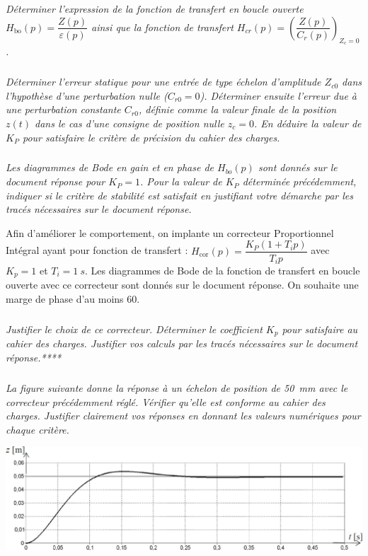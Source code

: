 \documentclass[10pt,fleqn]{article} %
\begin{document}
\subparagraph{}\textit{Déterminer l’expression de la fonction de transfert en boucle ouverte $H_{\text{bo}}(p)=\dfrac{Z(p)}{\varepsilon(p)}$ ainsi que la fonction de transfert  $H_{cr}(p)=
\left(\dfrac{Z(p)}{C_r(p)}\right)_{Z_c=0}$.}


\subparagraph{}\textit{Déterminer l’erreur statique pour une entrée de type échelon d’amplitude $Z_{c0}$ dans l’hypothèse d’une perturbation nulle ($C_{r0}=0$). Déterminer ensuite l’erreur due à une
perturbation constante $C_{r0}$, définie comme la valeur finale de la position $z(t)$ dans le cas d’une
consigne de position nulle $z_c= 0$. En déduire la valeur de $K_P$ pour satisfaire le critère de
précision du cahier des charges.}

\subparagraph{}\textit{Les diagrammes de Bode en gain et en phase de $H_{bo}(p)$ sont donnés sur le document réponse pour $K_P=1$. Pour la valeur de $K_P$ déterminée précédemment, indiquer si le critère de stabilité est satisfait en justifiant votre démarche par les tracés nécessaires sur le document
réponse.}

Afin d’améliorer le comportement, on implante un correcteur Proportionnel Intégral ayant pour
fonction de transfert : $H_{\text{cor}}(p)=\dfrac{K_P\left(1+T_i p\right)}{T_i p}$ avec $K_p=1$ et $T_i=\SI{1}{s}$.
Les diagrammes de Bode de la fonction de transfert en boucle ouverte avec ce correcteur sont
donnés sur le document réponse.
On souhaite une marge de phase d’au moins 60\degres.


\subparagraph{}\textit{Justifier le choix de ce correcteur. Déterminer le coefficient $K_p$ pour satisfaire au cahier des charges. Justifier vos calculs par les tracés nécessaires sur le document réponse.****}

\subparagraph{}\textit{La figure suivante donne la réponse à un échelon de position de \SI{50}{mm} avec le correcteur précédemment réglé. Vérifier qu’elle est conforme au cahier des charges. Justifier clairement vos réponses en donnant les valeurs numériques pour chaque critère.}


\begin{center}
\includegraphics[width=.8\linewidth]{images/ccp_12}
\end{center}
\end{document}
